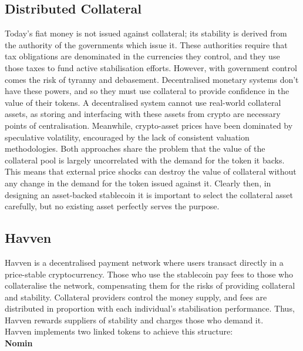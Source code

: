 \subsection{Distributed Collateral}

\noindent Today’s fiat money is not issued against collateral; its stability is derived from the authority of the governments which issue it. These authorities require that tax obligations are denominated in the currencies they control, and they use those taxes to fund active stabilisation efforts. However, with government control comes the risk of tyranny and debasement. Decentralised monetary systems don’t have these powers, and so they must use collateral to provide confidence in the value of their tokens. A decentralised system cannot use real-world collateral assets, as storing and interfacing with these assets from crypto are necessary points of centralisation. Meanwhile, crypto-asset prices have been dominated by speculative volatility, encouraged by the lack of consistent valuation methodologies. Both approaches share the problem that the value of the collateral pool is largely uncorrelated with the demand for the token it backs. This means that external price shocks can destroy the value of collateral without any change in the demand for the token issued against it. Clearly then, in designing an asset-backed stablecoin it is important to select the collateral asset carefully, but no existing asset perfectly serves the purpose.

\subsection{Havven}

\noindent Havven is a decentralised payment network where users transact directly in a price-stable cryptocurrency. Those who use the stablecoin pay fees to those who collateralise the network, compensating them for the risks of providing collateral and stability. Collateral providers control the money supply, and fees are distributed in proportion with each individual’s stabilisation performance. Thus, Havven rewards suppliers of stability and charges those who demand it. \\

\noindent Havven implements two linked tokens to achieve this structure: \\

\noindent \textbf{Nomin}

\vspace{1mm}

